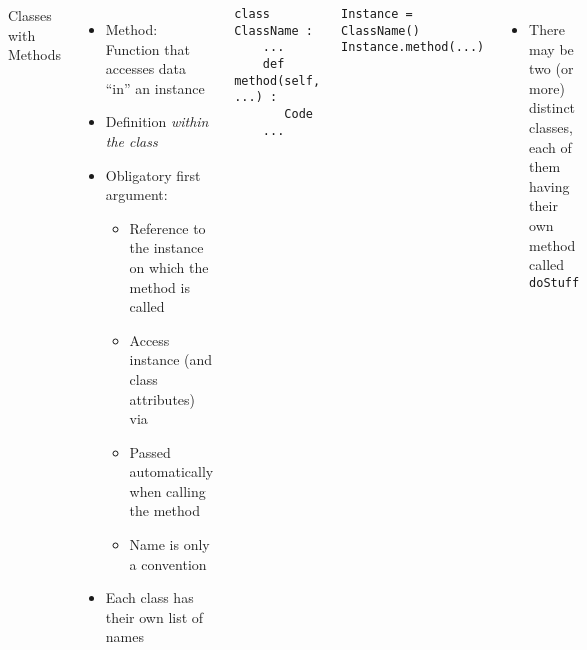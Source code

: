 \begin{frame}[fragile]
%
\begin{columns}[T]
\begin{Large}
	{Classes with Methods}
	\vspace{6pt}
\end{Large}
\begin{itemize}
\item Method: Function that accesses data \enquote{in} an instance
\item Definition \emph{within the class}
\item Obligatory first argument: 
	\begin{itemize}
	\item Reference to the instance on which the method is called
	\item[\Thus] Access instance (and class attributes) via 
	\item Passed automatically when calling the method
	\item Name  is only a convention
	\end{itemize}
\item Each class has their own list of names
\end{itemize}
%
\begin{codebox}
\begin{verbatim}
class ClassName :
    ...
    def method(self, ...) :
       Code
    ...
\end{verbatim}
\end{codebox}
%
\begin{codebox}
\begin{verbatim}
Instance = ClassName()
Instance.method(...)
\end{verbatim}
\end{codebox}
%
\begin{itemize}
\item[\Thus] There may be two (or more) distinct classes, each of them having their own method called \texttt{doStuff}
\end{itemize}
\end{columns}
%
\end{frame}


